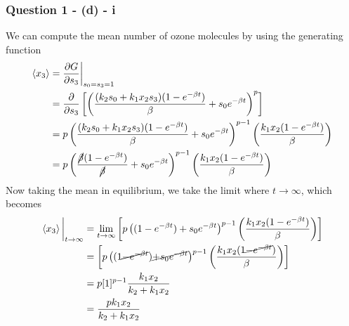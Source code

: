 \documentclass[11pt,a4paper]{article}
\begin{document}
\subsubsection{Question 1 - (d) - i}
\label{sec:question1:subsec:partd:subsub:i}
We can compute the mean number of ozone molecules by using the generating function 
\begin{align*}
\left\langle x_3 \right\rangle &=  \pdv{G}{s_3}\bigg\rvert_{s_0=s_3=1} \\
&= \pdv{s_3} \left[ \left( \frac{(k_2 s_0 + k_1 x_2 s_3) (1- e^{-\beta t} )}{\beta} + s_0 e^{-\beta t} \right)^p \right] \\
&= p \left( \frac{(k_2 s_0 + k_1 x_2 s_3) (1- e^{-\beta t} )}{\beta} + s_0 e^{-\beta t} \right)^{p-1} \left(\frac{k_1 x_2 (1 - e^{-\beta t} ) }{\beta}\right) \\
&= p \left( \frac{\cancel{\beta} (1- e^{-\beta t} )}{\cancel{\beta}} + s_0 e^{-\beta t} \right)^{p-1} \left(\frac{k_1 x_2 (1 - e^{-\beta t} ) }{\beta}\right) 
\end{align*} 
Now taking the mean in equilibrium, we take the limit where $t \rightarrow \infty$, which becomes
\begin{align*}
\left\langle x_3 \right\rangle \bigg\rvert_{t\rightarrow \infty} &= \lim_{t\rightarrow \infty} \left[ p \left( (1- e^{-\beta t} ) + s_0 e^{-\beta t} \right)^{p-1} \left(\frac{k_1 x_2 (1 - e^{-\beta t} ) }{\beta}\right) \right] \\
&= \left[ p \left( (1 \cancel{-e^{-\beta t}} ) \cancel{+ s_0 e^{-\beta t}} \right)^{p-1} \left(\frac{k_1 x_2 (1 \cancel{- e^{-\beta t} }) }{\beta}\right) \right] \\
&= p [1]^{p-1} \frac{k_1 x_2}{k_2 + k_1 x_2} \\
&= \frac{p k_1 x_2}{k_2 + k_1 x_2}
\end{align*}
\end{document}
